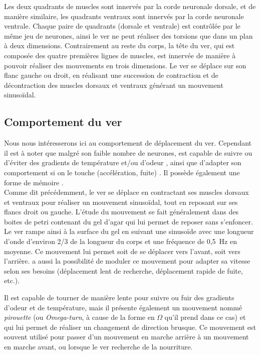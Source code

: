 Les deux quadrants de muscles sont innervés par la corde neuronale dorsale, et
de manière similaire, les quadrants ventraux sont innervés par la corde
neuronale ventrale. Chaque paire de quadrants (dorsale et ventrale) est
contrôlée par le même jeu de neurones, ainsi le ver ne peut réaliser des
torsions que dans un plan à deux dimensions. Contrairement au reste du corps, la
tête du ver, qui est composée des quatre premières lignes de muscles, est
innervée de manière à pouvoir réaliser des mouvements en trois dimensions. Le
ver se déplace sur son flanc gauche ou droit, en réalisant une succession de
contraction et de décontraction des muscles dorsaux et ventraux générant un
mouvement sinusoïdal.


\subsection{Comportement du ver} %
\label{sub:Comportement du ver}

Nous nous intéresserons ici au comportement de déplacement du ver. Cependant il est
à noter que malgré son faible nombre de neurones, \celeg{} est capable de
suivre ou d'éviter des gradients de température et/ou d'odeur
\cite{Ferree1999,Gray2005}, ainsi que d'adapter son comportement si on le touche
(accélération, fuite) \cite{Chalfie1985}. Il possède également une forme de
mémoire \cite{Rankin2005a}.\\

Comme dit précédemment, le ver se déplace en contractant ses muscles dorsaux et
ventraux pour réaliser un mouvement sinusoïdal, tout en reposant sur ses
flancs droit ou gauche. L'étude du mouvement se fait généralement dans des
boites de petri contenant du gel d'agar qui lui permet de reposer
sans s'enfoncer. Le ver rampe ainsi à la surface du gel en suivant une
sinusoïde avec une longueur d'onde d'environ 2/3 de la longueur du corps et 
une fréquence de 0,5~Hz en moyenne\cite{Boyle2009}. Ce mouvement lui permet
soit de se déplacer vers l'avant, soit vers l'arrière. \celeg{} a aussi la
possibilité de moduler ce mouvement pour adapter sa vitesse selon ses besoins
(déplacement lent de recherche, déplacement rapide de fuite, etc.).

Il est capable de tourner de manière lente pour suivre ou fuir des gradients
d'odeur et de température, mais il présente également un mouvement nommé
\textit{pirouette} (ou \textit{Omega-turn}, à cause de la forme en $\Omega$ qu'il
prend dans ce cas) et qui lui permet de réaliser un changement de direction
brusque. Ce mouvement est souvent utilisé pour passer d'un mouvement en marche
arrière à un mouvement en marche avant, ou lorsque le ver recherche de la
nourriture.\\

